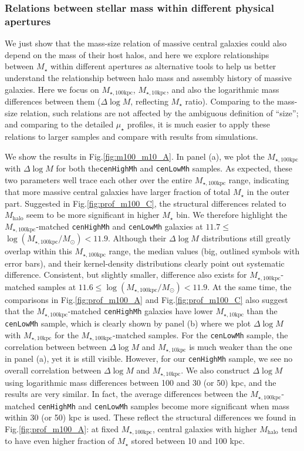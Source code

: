 \documentclass{emulateapj}
\def\rbcg{\texttt{cenHighMh}}
\def\nbcg{\texttt{cenLowMh}}
\def\mstar{{$M_{\star}$}}
\def\mhalo{{$M_{\mathrm{halo}}$}}
\def\minn{{$M_{\star,10\mathrm{kpc}}$}}
\def\mtot{{$M_{\star,100\mathrm{kpc}}$}}
\def\logmtot{{$\log (M_{\star,100\mathrm{kpc}}/M_{\odot})$}}
\def\mden{{$\mu_{\star}$}}
\begin{document}
\begin{CJK*}{UTF8}{gbsn}
\subsubsection{Relations between stellar mass within different physical apertures}
    \label{sssec:m100_m10}
    
    We just show that the mass-size relation of massive central galaxies could also 
    depend on the mass of their host halos, and here we explore relationships between 
    \mstar{} within different apertures as alternative tools to help
    us better understand the relationship between halo mass and assembly history of 
    massive galaxies.  
    Here we focus on \mtot{}, \minn{}, and also the logarithmic mass differences 
    between them ($\Delta \log M$, reflecting \mstar{} ratio). 
    Comparing to the mass-size relation, such relations are not affected by the ambiguous 
    definition of ``size''; and comparing to the detailed \mden{} profiles, 
    it is much easier to apply these relations to larger samples and compare with 
    results from simulations.
   
    We show the results in Fig.\ref{fig:m100_m10_A}.  
    In panel (a), we plot the \mtot{} with $\Delta \log M$ for both the\rbcg{} 
    and \nbcg{} samples. 
    As expected, these two parameters well trace each other over the entire 
    \mtot{} range, indicating that more massive central galaxies have larger 
    fraction of total \mstar{} in the outer part. 
    Suggested in Fig.\ref{fig:prof_m100_C}, the structural differences related to 
    \mhalo{} seem to be more significant in higher \mstar{} bin. 
    We therefore highlight the \mtot{}-matched \rbcg{} and \nbcg{} galaxies at 
    $11.7 \leq$\logmtot$< 11.9$. 
    Although their $\Delta \log M$ distributions still greatly overlap within 
    this \mtot{} range, the median values (big, outlined symbols with error bars),
    and their kernel-density distributions clearly point out systematic difference. 
    Consistent, but slightly smaller, difference also exists for \mtot{}-matched 
    samples at $11.6 \leq$\logmtot$< 11.9$. 
    At the same time, the comparisons in Fig.\ref{fig:prof_m100_A} and 
    Fig.\ref{fig:prof_m100_C} also suggest that the \mtot{}-matched \rbcg{} galaxies 
    have lower \minn{} than the \nbcg{} sample, which is clearly shown by panel (b)
    where we plot $\Delta \log M$ with \minn{} for the \mtot{}-matched samples.
    For the \nbcg{} sample, the correlation between between $\Delta \log M$ and \minn{}
    is much weaker than the one in panel (a), yet it is still visible.  
    However, for our \rbcg{} sample, we see no overall correlation between 
    $\Delta \log M$ and \minn{}.  
    We also construct $\Delta \log M$ using logarithmic mass differences between 
    100 and 30 (or 50) kpc, and the results are very similar.  
    In fact, the average differences between the \mtot{}-matched \rbcg{} and \nbcg{} 
    samples become more significant when mass within 30 (or 50) kpc is used.        
    These reflect the structural differences we found in Fig.\ref{fig:prof_m100_A}: 
    at fixed \mtot{}, central galaxies with higher \mhalo{} tend to have even higher 
    fraction of \mstar{} stored between 10 and 100 kpc. 
    

\end{CJK*}
\end{document}
